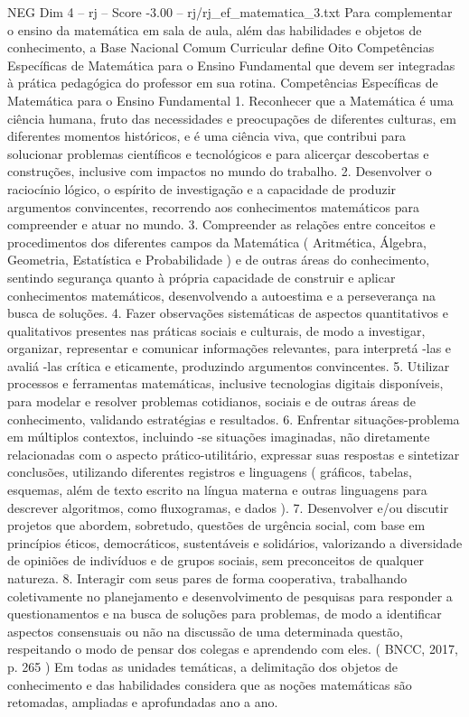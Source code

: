 \begin{textsample}{NEG Dim 4 – rj – Score -3.00 – rj/rj\_ef\_matematica\_3.txt}
Para complementar o ensino da matemática em sala de aula, além das habilidades e objetos de conhecimento, a Base Nacional Comum Curricular define Oito Competências Específicas de Matemática para o Ensino Fundamental que devem ser integradas à prática pedagógica do professor em sua rotina.
Competências Específicas de Matemática para o Ensino Fundamental 1.
Reconhecer que a Matemática é uma ciência humana, fruto das necessidades e preocupações de diferentes culturas, em diferentes momentos históricos, e é uma ciência viva, que contribui para solucionar problemas científicos e tecnológicos e para alicerçar descobertas e construções, inclusive com impactos no mundo do trabalho. 2.
Desenvolver o raciocínio lógico, o espírito de investigação e a capacidade de produzir argumentos convincentes, recorrendo aos conhecimentos matemáticos para compreender e atuar no mundo. 3.
Compreender as relações entre conceitos e procedimentos dos diferentes campos da Matemática ( Aritmética, Álgebra, Geometria, Estatística e Probabilidade ) e de outras áreas do conhecimento, sentindo segurança quanto à própria capacidade de construir e aplicar conhecimentos matemáticos, desenvolvendo a autoestima e a perseverança na busca de soluções. 4.
Fazer observações sistemáticas de aspectos quantitativos e qualitativos presentes nas práticas sociais e culturais, de modo a investigar, organizar, representar e comunicar informações relevantes, para interpretá -las e avaliá -las crítica e eticamente, produzindo argumentos convincentes. 5.
Utilizar processos e ferramentas matemáticas, inclusive tecnologias digitais disponíveis, para modelar e resolver problemas cotidianos, sociais e de outras áreas de conhecimento, validando estratégias e resultados. 6.
Enfrentar situações-problema em múltiplos contextos, incluindo -se situações imaginadas, não diretamente relacionadas com o aspecto prático-utilitário, expressar suas respostas e sintetizar conclusões, utilizando diferentes registros e linguagens ( gráficos, tabelas, esquemas, além de texto escrito na língua materna e outras linguagens para descrever algoritmos, como fluxogramas, e dados ). 7.
Desenvolver e/ou discutir projetos que abordem, sobretudo, questões de urgência social, com base em princípios éticos, democráticos, sustentáveis e solidários, valorizando a diversidade de opiniões de indivíduos e de grupos sociais, sem preconceitos de qualquer natureza. 8.
Interagir com seus pares de forma cooperativa, trabalhando coletivamente no planejamento e desenvolvimento de pesquisas para responder a questionamentos e na busca de soluções para problemas, de modo a identificar aspectos consensuais ou não na discussão de uma determinada questão, respeitando o modo de pensar dos colegas e aprendendo com eles. ( BNCC, 2017, p. 265 ) Em todas as unidades temáticas, a delimitação dos objetos de conhecimento e das habilidades considera que as noções matemáticas são retomadas, ampliadas e aprofundadas ano a ano.

\end{textsample}

